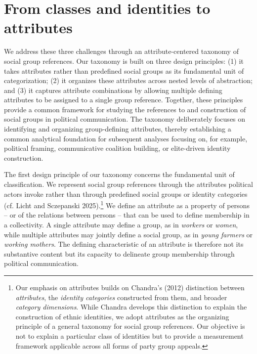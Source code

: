 \documentclass[12pt]{article}
\begin{document}
\section{From classes and identities to attributes}\label{from-classes-and-identities-to-attributes}

We address these three challenges through an attribute-centered taxonomy of social group references.
Our taxonomy is built on three design principles:
(1) it takes attributes rather than predefined social groups as its fundamental unit of categorization;
(2) it organizes these attributes across nested levels of abstraction; and
(3) it captures attribute combinations by allowing multiple defining attributes to be assigned to a single group reference.
Together, these principles provide a common framework for studying the references to and construction of social groups in political communication.
The taxonomy deliberately focuses on identifying and organizing group-defining attributes, thereby establishing a common analytical foundation for subsequent analyses focusing on, for example, political framing, communicative coalition building, or elite-driven identity construction.

The first design principle of our taxonomy concerns the fundamental unit of classification.
We represent social group references through the attributes political actors invoke rather than through predefined social groups or identity categories (cf. Licht and Sczepanski 2025).\footnote{Our emphasis on attributes builds on Chandra's (2012) distinction between \emph{attributes}, the \emph{identity categories} constructed from them, and broader \emph{category dimensions}.
  While Chandra develops this distinction to explain the construction of ethnic identities, we adopt attributes as the organizing principle of a general taxonomy for social group references.
  Our objective is not to explain a particular class of identities but to provide a measurement framework applicable across all forms of party group appeals.}
We define an attribute as a property of persons -- or of the relations between persons -- that can be used to define membership in a collectivity.
A single attribute may define a group, as in \emph{workers} or \emph{women}, while multiple attributes may jointly define a social group, as in \emph{young farmers} or \emph{working mothers}.
The defining characteristic of an attribute is therefore not its substantive content but its capacity to delineate group membership through political communication.
\end{document}
